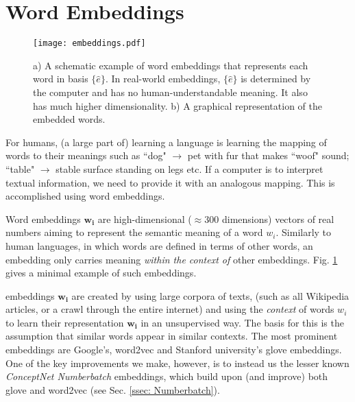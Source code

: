 \section{Word Embeddings \label{ssec: word embeddings}}

    \begin{figure}
        \centering
        \texttt{[image: embeddings.pdf]}
        \caption{a) A schematic example of word \glspl{embedding} that represents each word in basis $\{\hat{e}\}$. In real-world embeddings, $\{\hat{e}\}$ is determined by the computer and has no human-understandable meaning. It also has much higher dimensionality. b) A graphical representation of the embedded words.}
        \label{fig:word embedding}
    \end{figure}

    For humans, (a large part of) learning a language is learning the mapping of words to their meanings such as ``dog" $\rightarrow$ pet with fur that makes ``woof" sound; ``table" $\rightarrow$ stable surface standing on legs etc. If a computer is to interpret textual information, we need to provide it with an analogous mapping. This is accomplished using word embeddings.
    
    Word \glspl{embedding} $\mathbf{w_i}$ are high-dimensional ($\approx 300$ dimensions) vectors of real numbers aiming to represent the semantic meaning of a word $w_i$. Similarly to human languages, in which words are defined in terms of other words, an \gls{embedding} only carries meaning \textit{within the context of} other \glspl{embedding}. Fig. \ref{fig:word embedding} gives a minimal example of such \glspl{embedding}.
    
    \Glspl{embedding} $\mathbf{w_i}$ are created by using large corpora of texts, (such as all Wikipedia articles, or a crawl through the entire internet) and using the \textit{context} of words $w_i$ to learn their representation $\mathbf{w_i}$ in an unsupervised way. The basis for this is the assumption that similar words appear in similar contexts\cite{word2vec}.
    The most prominent \glspl{embedding} are Google's, word2vec\cite{word2vec} and Stanford university's \gls{glove}\cite{glove} \glspl{embedding}. One of the key improvements we make, however, is to instead us the lesser known \textit{ConceptNet Numberbatch} \glspl{embedding}\cite{conceptnet}, which build upon (and improve) both \gls{glove} and word2vec (see Sec. \ref{ssec: Numberbatch}).

